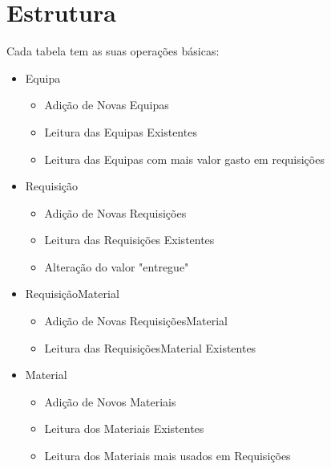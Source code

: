\section{Estrutura}

Cada tabela tem as suas operações básicas:
\begin{itemize}
    \item Equipa
    \begin{itemize}
        \item Adição de Novas Equipas
        \item Leitura das Equipas Existentes
        \item Leitura das Equipas com mais valor gasto em requisições
    \end{itemize}
    
    \item Requisição
    \begin{itemize}
        \item Adição de Novas Requisições
        \item Leitura das Requisições Existentes
        \item Alteração do valor "entregue"
    \end{itemize}
    
    \item RequisiçãoMaterial
    \begin{itemize}
        \item Adição de Novas RequisiçõesMaterial
        \item Leitura das RequisiçõesMaterial Existentes
    \end{itemize}
    \item Material
    \begin{itemize}
        \item Adição de Novos Materiais
        \item Leitura dos Materiais Existentes
        \item Leitura dos Materiais mais usados em Requisições
    \end{itemize}
\end{itemize}


